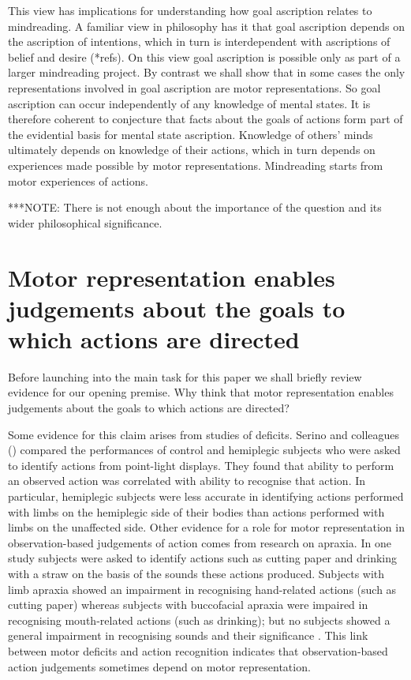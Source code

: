 \documentclass[12pt,\papersize]{extarticle}
\begin{document}
This view has implications for understanding how goal ascription relates to mindreading. A familiar view in philosophy has it that goal ascription depends on the ascription of intentions, which in turn is interdependent with ascriptions of belief and desire (*refs). On this view goal ascription is possible only as part of a larger mindreading project. By contrast we shall show that in some cases the only representations involved in goal ascription are motor representations. So goal ascription can occur independently of any knowledge of mental states. It is therefore coherent to conjecture that facts about the goals of actions form part of the evidential basis for mental state ascription. Knowledge of others' minds ultimately depends on knowledge of their actions, which in turn depends on experiences made possible by motor representations.  Mindreading starts from motor experiences of actions.

***NOTE: There is not enough about the importance of the question and its wider philosophical significance.


\section{Motor representation enables judgements about the goals to which actions are directed}
\label{sec:evidence}
Before launching into the main task for this paper we shall briefly review evidence for our opening premise.
Why think that motor representation enables judgements about the goals to which actions are directed?

Some evidence for this claim arises from studies of deficits.
Serino and colleagues (\citeyear{serino:2009_lesions_}) compared the performances of control and hemiplegic subjects who were asked to identify actions from point-light displays. They found that ability to perform an observed action was correlated with ability to recognise that action.  In particular, hemiplegic subjects were less accurate in identifying actions performed with limbs on the hemiplegic side of their bodies than actions performed with limbs on the unaffected side.  Other evidence for a role for motor representation in observation-based judgements of action comes from research on apraxia.  In one study subjects were asked to identify actions such as cutting paper and drinking with a straw on the basis of the sounds these actions produced.  Subjects with limb apraxia showed an impairment in recognising hand-related actions (such as cutting paper) whereas subjects with buccofacial apraxia were impaired in recognising mouth-related actions (such as drinking); but no subjects showed a general impairment in recognising sounds and their significance \citep{pazzaglia:2008_sound_}. This link between motor deficits and action recognition indicates that observation-based action judgements sometimes depend on motor representation.  
\end{document}
